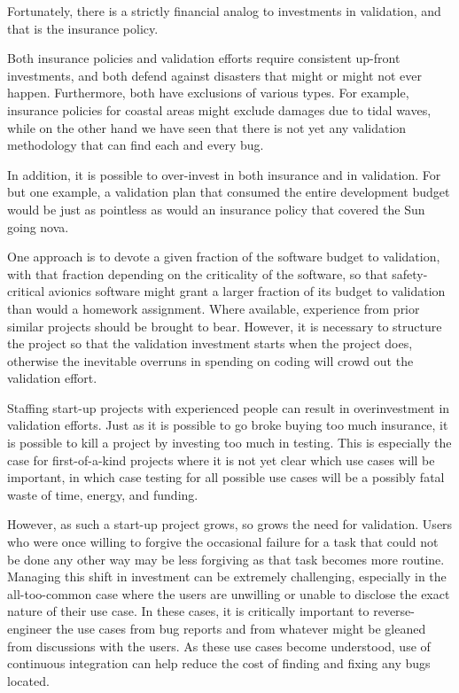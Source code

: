 Fortunately, there is a strictly financial analog to investments in
validation, and that is the insurance policy.


Both insurance policies and validation efforts require consistent
up-front investments, and both defend against disasters that might
or might not ever happen.
Furthermore, both have exclusions of various types.
For example, insurance policies for coastal areas might exclude
damages due to tidal waves, while on the other hand we have seen
that there is not yet any validation methodology that can find
each and every bug.

In addition, it is possible to over-invest in both insurance and
in validation.
For but one example, a validation plan that consumed the entire
development budget would be just as pointless as would an insurance
policy that covered the Sun going nova.

One approach is to devote a given fraction of the software budget to
validation, with that fraction depending on the criticality of the
software, so that safety-critical avionics software might grant a
larger fraction of its budget to validation than would a homework
assignment.
Where available, experience from prior similar projects should be
brought to bear.
However, it is necessary to structure the project so that the validation
investment starts when the project does, otherwise the inevitable overruns
in spending on coding will crowd out the validation effort.

Staffing start-up projects with experienced people can result in
overinvestment in validation efforts.
Just as it is possible to go broke buying too much insurance, it is
possible to kill a project by investing too much in testing.
This is especially the case for first-of-a-kind projects where it is
not yet clear which use cases will be important, in which case testing
for all possible use cases will be a possibly fatal waste of time,
energy, and funding.

However, as such a start-up project grows, so grows the need for
validation.
Users who were once willing to forgive the occasional failure for a
task that could not be done any other way may be less forgiving
as that task becomes more routine.
Managing this shift in investment can be extremely challenging,
especially in the all-too-common case where the users are unwilling
or unable to disclose the exact nature of their use case.
In these cases, it is critically important to reverse-engineer the
use cases from bug reports and from whatever might be gleaned from
discussions with the users.
As these use cases become understood, use of continuous integration
can help reduce the cost of finding and fixing any bugs located.


